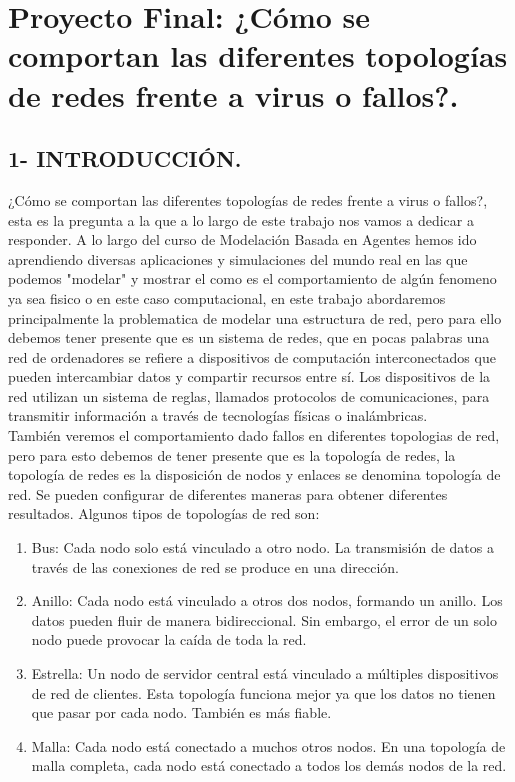 \documentclass[12pt]{article}
\begin{document}

{\color{red} \section*{Proyecto Final: ¿Cómo se comportan las diferentes topologías de redes frente a virus o fallos?.}}
\vspace{2em}

{\color{blue} \subsection*{1- INTRODUCCIÓN.}}
\vspace{1em}

¿Cómo se comportan las diferentes topologías de redes frente a virus o fallos?, esta es la pregunta a la que a lo largo de este trabajo nos vamos a dedicar a responder.
A lo largo del curso de Modelación Basada en Agentes hemos ido aprendiendo diversas aplicaciones y simulaciones del mundo real en las que podemos "modelar" y mostrar el como es el comportamiento de algún fenomeno
ya sea fisico o en este caso computacional, en este trabajo abordaremos principalmente la problematica de modelar una estructura de red, pero para ello debemos tener presente que es un sistema de redes, que en pocas palabras una red de ordenadores se refiere a dispositivos de computación 
interconectados que pueden intercambiar datos y compartir recursos entre sí. 
Los dispositivos de la red utilizan un sistema de reglas, llamados protocolos de comunicaciones, para transmitir información a través de tecnologías físicas o inalámbricas.\\

También veremos el comportamiento dado fallos en diferentes topologias de red, pero para esto debemos de tener presente que es la topología de redes, la topología de redes es la disposición de nodos y enlaces se denomina topología de red. Se pueden configurar de diferentes maneras para obtener diferentes resultados. Algunos tipos de topologías de red son:\\
\begin{enumerate}
    \item Bus: Cada nodo solo está vinculado a otro nodo. La transmisión de datos a través de las conexiones de red se produce en una dirección.
    \item Anillo: Cada nodo está vinculado a otros dos nodos, formando un anillo. Los datos pueden fluir de manera bidireccional. Sin embargo, el error de un solo nodo puede provocar la caída de toda la red.
    \item Estrella: Un nodo de servidor central está vinculado a múltiples dispositivos de red de clientes. Esta topología funciona mejor ya que los datos no tienen que pasar por cada nodo. También es más fiable.
    \item Malla: Cada nodo está conectado a muchos otros nodos. En una topología de malla completa, cada nodo está conectado a todos los demás nodos de la red.
\end{enumerate}
\end{document}
